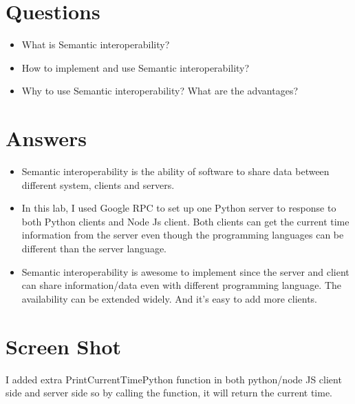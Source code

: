 \documentclass[12pt,letterpaper,boxed]{hmcpset}
\begin{document}
\section*{Questions}
\begin{itemize}
  \item What is Semantic interoperability?
  \item How to implement and use Semantic interoperability?
  \item Why to use Semantic interoperability? What are the advantages?
\end{itemize}
\section*{Answers}
\begin{itemize}
  \item Semantic interoperability is the ability of software to share data between different system, clients and servers.
  \item In this lab, I used Google RPC to set up one Python server to response to both Python clients and Node Js client. Both clients can get the current time information from the server even though the programming languages can be different than the server language.
  \item Semantic interoperability is awesome to implement since the server and client can share information/data even with different programming language. The availability can be extended widely. And it's easy to add more clients.
  
\end{itemize}
\section*{Screen Shot}
I added extra PrintCurrentTimePython function in both python/node JS client side and server side so by calling the function, it will return the current time.
\end{document}
